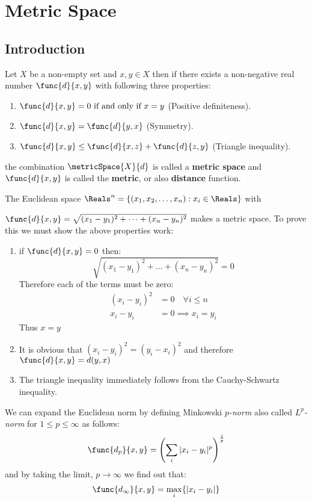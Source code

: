 
\chapter{Metric Space}
\thispagestyle{headings}
\section{Introduction}

Let \(X\) be a non-empty set and \(x,y \in X\) then if there exists a non-negative real number \(\func{d}{x,y}\) with following three properties:
\begin{enumerate}
    \item \(\func{d}{x,y} = 0 \text{ if and only if } x = y\) (Positive definiteness).
    \item \(\func{d}{x,y} = \func{d}{y,x}\) (Symmetry).
    \item \(\func{d}{x,y} \leq \func{d}{x,z} + \func{d}{z,y}\) (Triangle inequality).
\end{enumerate}
the combination \(\metricSpace{X}{d}\) is called a \textbf{metric space} and \(\func{d}{x,y}\) is called the \textbf{metric}, or also \textbf{distance} function.
\begin{example}
    The Euclidean space \(\Reals^n = \{(x_1,x_2,\dots,x_n) : x_i \in \Reals\}\) with \raggedright \(\func{d}{x,y}=\sqrt{(x_1-y_1)^2 + \dots + (x_n - y_n)^2} \) makes a metric space. To prove this we must show the above properties work:
    \begin{enumerate}
        \item if \(\func{d}{x,y} = 0\) then:
              \[ \sqrt{(x_1-y_1)^2 + \dots + (x_n - y_n)^2} = 0 \]
              Therefore each of the terms must be zero:
              \begin{align*}
                  (x_i - y_i)^2 & = 0 \quad  \forall i \leq n \\
                  x_i - y_i     & = 0 \implies x_i = y_i
              \end{align*}
              Thus \(x = y\)
        \item  It is obvious that \((x_i - y_i)^2 = (y_i - x_i)^2\) and therefore \(\func{d}{x,y} = d(y,x)\)
        \item  The triangle inequality immediately follows from the Cauchy-Schwartz inequality.
    \end{enumerate}
\end{example}

We can expand the Euclidean norm by defining Minkowski \textit{\(p\)-norm} also called \textit{\(L^p\)-norm} for \(1 \leq p \leq \infty\) as follows:
\[\func{d_p}{x,y} = \left(\sum_{i}{|x_i - y_i|^p}\right)^{\frac{1}{p}}\]
and by taking the limit, \(p \to \infty\) we find out that:
\[\func{d_\infty}{x,y} = \max_{i} \{|x_i - y_i|\}\]


